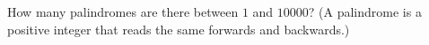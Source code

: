 How many palindromes are there between $1$ and $10000$? (A palindrome is a positive integer that reads the same forwards and backwards.)
